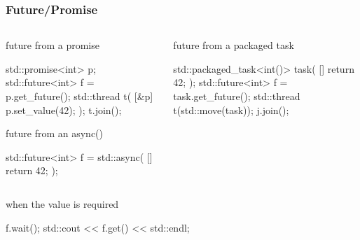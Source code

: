 \documentclass[UTF8,lualatex]{ctexbeamer}
\begin{document}
\begin{frame}[fragile]
    \frametitle{Future/Promise}
    \scriptsize
    \begin{columns}[t]
        \begin{column}{.5\textwidth}
            \begin{exampleblock}{future from a promise}
                \begin{cppcode}
                    std::promise<int> p;
                    std::future<int> f = p.get_future();
                    std::thread t(
                        [&p]{ p.set_value(42); });
                    t.join();
                \end{cppcode}
            \end{exampleblock}
            \begin{exampleblock}{future from an async()}
                \begin{cppcode}
                    std::future<int> f = std::async(
                        []{ return 42; });
                \end{cppcode}
            \end{exampleblock}
        \end{column}
        \begin{column}{.5\textwidth}
            \begin{exampleblock}{future from a packaged task}
                \begin{cppcode}
                    std::packaged_task<int()> task(
                        []{ return 42; });
                    std::future<int> f = task.get_future();
                    std::thread t(std::move(task));
                    j.join();
                \end{cppcode}
            \end{exampleblock}
        \end{column}
    \end{columns}
    \begin{block}{when the value is required}
        \begin{cppcode}
            f.wait();
            std::cout << f.get() << std::endl;
        \end{cppcode}
    \end{block}
\end{frame}
\end{document}
